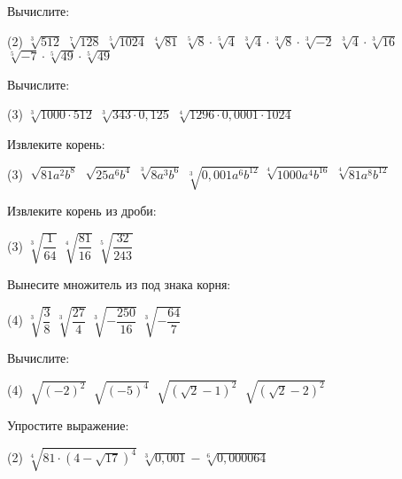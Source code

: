\begin{class}[number=2]
	\begin{listofex}
		\item Вычислите:
		\begin{tasks}(2)
			\task \( \sqrt[3]{512} \)
			\task \( \sqrt[7]{128} \)
			\task \( \sqrt[5]{1024} \)
			\task \( \sqrt[4]{81} \)
			\task \( \sqrt[5]{8} \cdot \sqrt[5]{4} \)
			\task \( \sqrt[3]{4} \cdot \sqrt[3]{8} \cdot \sqrt[3]{-2} \)
			\task \( \sqrt[3]{4} \cdot \sqrt[3]{16} \)
			\task \( \sqrt[5]{-7} \cdot \sqrt[5]{49} \cdot \sqrt[5]{49} \)
		\end{tasks}
		\item Вычислите:
		\begin{tasks}(3)
			\task \( \sqrt[3]{1000 \cdot 512} \)
			\task \( \sqrt[3]{343 \cdot 0,125} \)
			\task \( \sqrt[4]{1296 \cdot 0,0001 \cdot 1024} \)
		\end{tasks}
		\item Извлеките корень:
		\begin{tasks}(3)
			\task \( \sqrt[]{ 81a^2b^8 } \)
			\task \( \sqrt[]{ 25a^6b^4 } \)
			\task \( \sqrt[3]{ 8a^3b^6 } \)
			\task \( \sqrt[3]{ 0,001a^6b^{12} } \)
			\task \( \sqrt[4]{ 1000a^4b^{16} } \)
			\task \( \sqrt[4]{ 81a^8b^{12}} \)
		\end{tasks}
		\item Извлеките корень из дроби:
		\begin{tasks}(3)
			\task \( \sqrt[3]{\dfrac{1}{64}} \)
			\task \( \sqrt[4]{\dfrac{81}{16}} \)
			\task \( \sqrt[5]{\dfrac{32}{243}} \)
		\end{tasks}
		\item Вынесите множитель из под знака корня:
		\begin{tasks}(4)
			\task \( \sqrt[3]{\dfrac{3}{8}} \)
			\task \( \sqrt[3]{\dfrac{27}{4}} \)
			\task \( \sqrt[3]{-\dfrac{250}{16}} \)
			\task \( \sqrt[3]{-\dfrac{64}{7}} \)
		\end{tasks}
		\item Вычислите:
		\begin{tasks}(4)
			\task \( \sqrt[]{(-2)^2} \)
			\task \( \sqrt[]{(-5)^4} \)
			\task \( \sqrt[]{(\sqrt{2}-1)^2} \)
			\task \( \sqrt[]{(\sqrt{2}-2)^2} \)
		\end{tasks}
		\item Упростите выражение:
		\begin{tasks}(2)
			\task \( \sqrt[4]{81 \cdot (4-\sqrt{17})^4} \)
			\task \( \sqrt[3]{0,001} - \sqrt[6]{0,000064} \)

\end{tasks}
\end{listofex}
\end{class}
